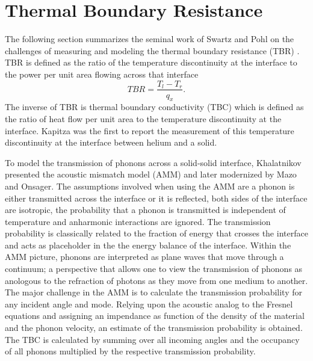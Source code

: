 \section{Thermal Boundary Resistance}
The following section summarizes the seminal work of Swartz and Pohl on the challenges of measuring and modeling the thermal boundary resistance (TBR) \cite{RevModPhys.61.605}. TBR is defined as the ratio of the temperature discontinuity at the interface to the power per unit area flowing across that interface
\begin{equation}
TBR=\frac{T_l-T_r}{q_x}.
\end{equation}
The inverse of TBR is thermal boundary conductivity (TBC) which is defined as the ratio of heat flow per unit area to the temperature discontinuity at the interface. Kapitza was the first to report the measurement of this temperature discontinuity at the interface between helium and a solid.

To model the transmission of phonons across a solid-solid interface, Khalatnikov presented the acoustic mismatch model (AMM) and later modernized by Mazo and Onsager. The assumptions involved when using the AMM are a phonon is either transmitted across the interface or it is reflected, both sides of the interface are isotropic, the probability that a phonon is transmitted is independent of temperature and anharmonic interactions are ignored. The transmission probability is classically related to the fraction of energy that crosses the interface and acts as placeholder in the the energy balance of the interface. Within the AMM picture, phonons are interpreted as plane waves that move through a continuum; a perspective that allows one to view the transmission of phonons as anologous to the refraction of photons as they move from one medium to another. The major challenge in the AMM is to calculate the transmission probability for any incident angle and mode. Relying upon the acoustic analog to the Fresnel equations and assigning an impendance as function of the density of the material and the phonon velocity, an estimate of the transmission probability is obtained. The TBC is calculated by summing over all incoming angles and the occupancy of all phonons multiplied by the respective transmission probability.


